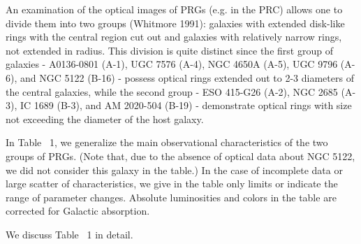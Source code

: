 An examination of the optical images of PRGs (e.g. in the PRC)
allows one to divide them into two groups (Whitmore 1991):
galaxies with extended disk-like rings with the central
region cut out and galaxies with relatively narrow rings, not 
extended in radius. This division is quite distinct
since the first group of galaxies - A0136-0801 (A-1), UGC 7576 (A-4),
NGC 4650A (A-5), UGC 9796 (A-6), and NGC 5122 (B-16) - possess
optical rings extended out to 2-3 diameters of the central
galaxies, while the second group - ESO 415-G26 (A-2),
NGC 2685 (A-3), IC 1689 (B-3), and AM 2020-504 (B-19) -
demonstrate optical rings with size not exceeding 
the diameter of the host galaxy. 

In Table~ 1, we generalize the main observational characteristics
of the two groups of PRGs. (Note that, due to the absence of 
optical data about NGC 5122, we did not consider this galaxy
in the table.) 
In the case of incomplete data or large scatter of
characteristics, we give in the table only limits or
indicate the range of parameter changes. 
Absolute luminosities and
colors in the table are corrected for Galactic absorption.  

We discuss Table~ 1 in detail.

